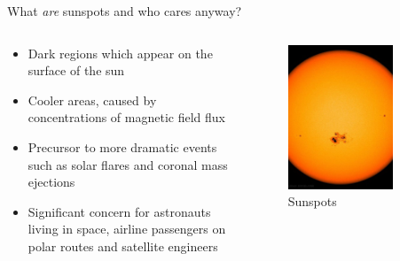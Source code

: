 \documentclass[aspectratio=169]{beamer}
\begin{document}
\begin{frame}{What \emph{are} sunspots and who cares anyway?}
  \begin{columns}
    \begin{column}{0.6\textwidth}
      \begin{itemize}
        \item Dark regions which appear on the surface of the sun
        \item Cooler areas, caused by concentrations of magnetic field flux
        \item Precursor to more dramatic events such as solar flares and
              coronal mass ejections
        \item Significant concern for astronauts living in space, airline
              passengers on polar routes and satellite engineers
      \end{itemize}
    \end{column}%
    \begin{column}{0.4\textwidth}
      \begin{figure}
        \includegraphics[width=0.8\textwidth]{sun.jpg}
        \caption{Sunspots}
      \end{figure}
    \end{column}
  \end{columns}
\end{frame}
\end{document}

